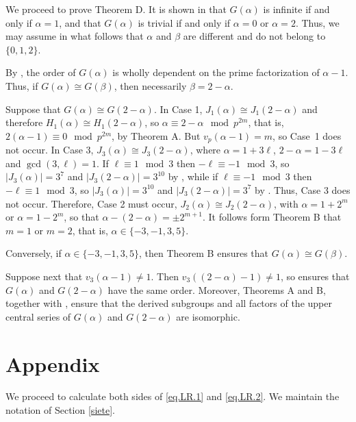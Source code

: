 \documentclass{amsart}
\theoremstyle{definition}
\theoremstyle{remark}
\begin{document}
We proceed to prove Theorem D. It is shown in \cite{M} that $G(\alpha)$ is infinite if and only if $\alpha=1$,
and that $G(\alpha)$ is trivial if and only if $\alpha=0$ or $\alpha=2$. Thus,
we may assume in what follows that $\alpha$ and $\beta$ are different and do not belong to $\{0,1,2\}$.

By \cite[Theorem 10.1]{MS}, the order of $G(\alpha)$ is wholly dependent on the prime factorization of $\alpha-1$.
Thus, if $G(\alpha)\cong G(\beta)$, then necessarily $\beta=2-\alpha$.

Suppose that $G(\alpha)\cong G(2-\alpha)$. In Case 1, $J_1(\alpha)\cong J_1(2-\alpha)$ and therefore $H_1(\alpha)\cong H_1(2-\alpha)$,
so $\alpha\equiv 2-\alpha\mod p^{2m}$, that is, $2(\alpha-1)\equiv 0\mod p^{2m}$, by Theorem A. But $v_{p}(\alpha-1)=m$,
so Case~1 does not occur. In Case 3, $J_3(\alpha)\cong J_3(2-\alpha)$, where
$\alpha=1+3\ell$, $2-\alpha=1-3\ell$ and $\gcd(3,\ell)=1$. If $\ell\equiv 1\mod 3$ then $-\ell\equiv -1\mod 3$, so
$|J_3(\alpha)|=3^7$ and $|J_3(2-\alpha)|=3^{10}$ by \cite[Theorem 10.1]{MS}, while if $\ell\equiv -1\mod 3$ then $-\ell\equiv 1\mod 3$, so
$|J_3(\alpha)|=3^{10}$ and $|J_3(2-\alpha)|=3^{7}$ by \cite[Theorem 10.1]{MS}. Thus, Case 3 does not occur. Therefore, Case 2 must occur,
$J_2(\alpha)\cong J_2(2-\alpha)$, with $\alpha=1+2^m$ or $\alpha=1-2^m$, so that $\alpha-(2-\alpha)=\pm 2^{m+1}$. It follows form
Theorem B that $m=1$ or $m=2$, that is, $\alpha\in\{-3,-1,3,5\}$.

Conversely, if $\alpha\in\{-3,-1,3,5\}$, then Theorem B ensures that $G(\alpha)\cong G(\beta)$.

Suppose next that $v_3(\alpha-1)\neq 1$. Then $v_3((2-\alpha)-1)\neq 1$, so \cite[Theorem 10.1]{MS} ensures that
$G(\alpha)$ and $G(2-\alpha)$ have the same order. Moreover, Theorems A and B, together with \cite[Theorem 8.1]{MS},
ensure that the derived subgroups and all factors of the upper central series of $G(\alpha)$ and $G(2-\alpha)$ are isomorphic.



\section{Appendix}

We proceed to calculate both sides of \eqref{eq.LR.1} and \eqref{eq.LR.2}. We maintain the notation of Section \ref{siete}.
\end{document}
